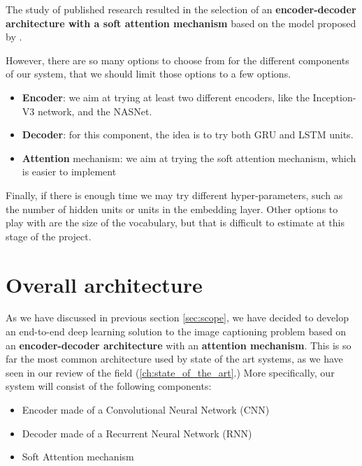The study of published research resulted in the selection of an \textbf{encoder-decoder architecture with a soft attention mechanism} based on the model proposed by \citet{Xu2015}. 

However, there are so many options to choose from for the different components of our system, that we should limit those options to a few options.
\begin{itemize}
    \item \textbf{Encoder}: we aim at trying at least two different encoders, like the Inception-V3 network, and the NASNet.
    \item \textbf{Decoder}: for this component, the idea is to try both GRU and LSTM units. 
    \item \textbf{Attention} mechanism: we aim at trying the soft attention mechanism, which is easier to implement
\end{itemize}

Finally, if there is enough time we may try different hyper-parameters, such as the number of hidden units or units in the embedding layer. Other options to play with are the size of the vocabulary, but that is difficult to estimate at this stage of the project.

\section{Overall architecture}

As we have discussed in previous section \cref{sec:scope}, we have decided to develop an end-to-end deep learning solution to the image captioning problem based on an \textbf{encoder-decoder architecture} with an \textbf{attention mechanism}. This is so far the most common architecture used by state of the art systems, as we have seen in our review of the field (\cref{ch:state_of_the_art}.) More specifically, our system will consist of the following components:

\begin{itemize}
    \item Encoder made of a Convolutional Neural Network (CNN)
    \item Decoder made of a Recurrent Neural Network (RNN)
    \item Soft Attention mechanism
\end{itemize}


